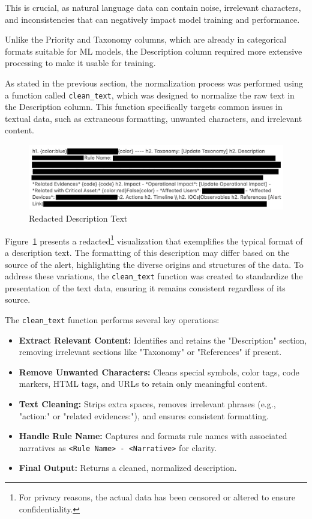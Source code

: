 This is crucial, as natural language data can contain noise, irrelevant characters, and inconsistencies that can negatively impact model training and performance. 

Unlike the Priority and Taxonomy columns, which are already in categorical formats suitable for ML models, the Description column required more extensive processing to make it usable for training.

As stated in the previous section, the normalization process was performed using a function called \texttt{clean\_text}, which was designed to normalize the raw text in the Description column. 
This function specifically targets common issues in textual data, such as extraneous formatting, unwanted characters, and irrelevant content.

\begin{figure}[h!]
    \centering
    \includegraphics[width=\textwidth]{ch3/assets/redacted_description_text.png}
    \caption{Redacted Description Text}
    \label{fig:redacted_description_text}
\end{figure}

Figure~\ref{fig:redacted_description_text} presents a redacted\footnote{For privacy reasons, the actual data has been censored or altered to ensure confidentiality.} visualization that exemplifies the typical format of a description text.
The formatting of this description may differ based on the source of the alert, highlighting the diverse origins and structures of the data. 
To address these variations, the \texttt{clean\_text} function was created to standardize the presentation of the text data, ensuring it remains consistent regardless of its source.

The \texttt{clean\_text} function performs several key operations:

\begin{itemize}
    \item \textbf{Extract Relevant Content:} Identifies and retains the "Description" section, removing irrelevant sections like "Taxonomy" or "References" if present.
    \item \textbf{Remove Unwanted Characters:} Cleans special symbols, color tags, code markers, HTML tags, and URLs to retain only meaningful content.
    \item \textbf{Text Cleaning:} Strips extra spaces, removes irrelevant phrases (e.g., "action:" or "related evidences:"), and ensures consistent formatting.
    \item \textbf{Handle Rule Name:} Captures and formats rule names with associated narratives as \texttt{<Rule Name> - <Narrative>} for clarity.
    \item \textbf{Final Output:} Returns a cleaned, normalized description.
\end{itemize}

